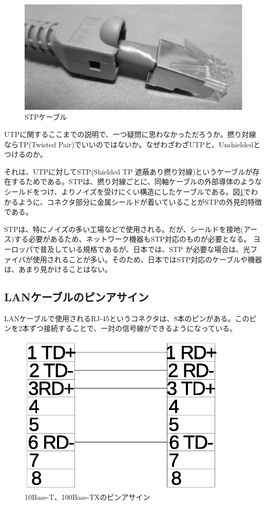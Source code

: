 \begin{figure}[htbp]
	\includegraphics[width=12cm,clip]{draw/stp.eps}
	\caption{STPケーブル}
	\label{fig:stp}
\end{figure}

UTPに関するここまでの説明で、一つ疑問に思わなかっただろうか。撚り対線ならTP(Twisted Pair)でいいのではないか。なぜわざわざUTPと、Unshieldedとつけるのか。

それは、UTPに対してSTP(Shielded TP 遮蔽あり撚り対線)というケーブルが存在するためである。STPは、撚り対線ごとに、同軸ケーブルの外部導体のようなシールドをつけ、よりノイズを受けにくい構造にしたケーブルである。図\ref{fig:stp}でわかるように、コネクタ部分に金属シールドが着いていることがSTPの外見的特徴である。

STPは、特にノイズの多い工場などで使用される。だが、シールドを接地(アース)する必要があるため、ネットワーク機器もSTP対応のものが必要となる。
ヨーロッパで普及している規格であるが、日本では、STP が必要な場合は、光ファイバが使用されることが多い。そのため、日本ではSTP対応のケーブルや機器は、あまり見かけることはない。

\subsection{LANケーブルのピンアサイン}

LANケーブルで使用されるRJ-45というコネクタは、8本のピンがある。このピンを2本ずつ接続することで、一対の信号線ができるようになっている。

\begin{figure}[htbp]
	\includegraphics[width=10cm,clip]{draw/cat5pin.eps}
	\caption{10Base-T、100Base-TXのピンアサイン}
	\label{fig:pinassign}
\end{figure}


